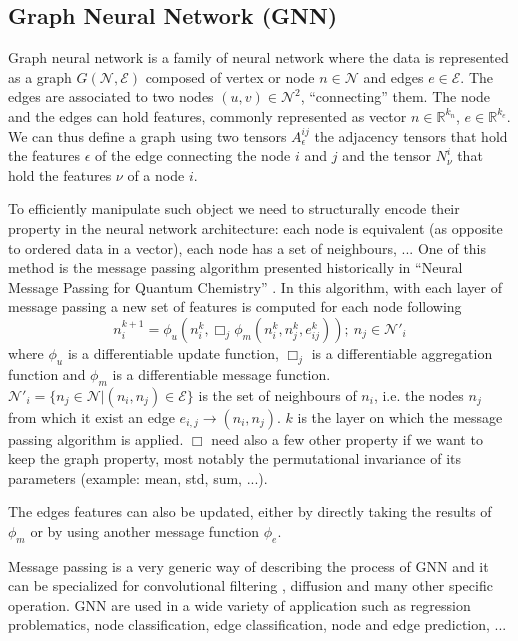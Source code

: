 \subsection{Graph Neural Network (GNN)}

Graph neural network is a family of neural network where the data is represented as a graph $G(\mathcal{N},\mathcal{E})$ composed of vertex or node $n \in \mathcal{N}$ and edges $e \in \mathcal{E}$. The edges are associated to two nodes $(u, v) \in \mathcal{N}^2$, ``connecting'' them. The node and the edges can hold features, commonly represented as vector $n \in \mathbb{R}^{k_{n}}$, $e \in \mathbb{R}^{k_{e}}$. We can thus define a graph using two tensors $A^{ij}_{\epsilon}$ the adjacency tensors that hold the features $\epsilon$ of the edge connecting the node $i$ and $j$ and the tensor $N^{i}_{\nu}$ that hold the features $\nu$ of a node $i$.

To efficiently manipulate such object we need to structurally encode their property in the neural network architecture: each node is equivalent (as opposite to ordered data in a vector), each node has a set of neighbours, ... One of this method is the message passing algorithm presented historically in ``Neural Message Passing for Quantum Chemistry'' \cite{gilmer_neural_2017}. In this algorithm, with each layer of message passing a new set of features is computed for each node following
\begin{equation}
  n_i^{k+1} = \phi_u (n_i^k, \Box_j \phi_m(n_i^k, n_j^k, e^k_{ij})); ~ n_j \in \mathcal{N}'_i
\end{equation}
where $\phi_u$ is a differentiable update function, $\Box_j$ is a differentiable aggregation function and $\phi_m$ is a differentiable message function. $\mathcal{N}'_i = \{n_j \in \mathcal{N} | (n_i, n_j) \in \mathcal{E}\}$ is the set of neighbours of $n_i$, i.e. the nodes $n_j$ from which it exist an edge $e_{i,j} \rightarrow (n_i, n_j)$. $k$ is the layer on which the message passing algorithm is applied. $\Box$ need also a few other property if we want to keep the graph property, most notably the permutational invariance of its parameters (example: mean, std, sum, ...).

The edges features can also be updated, either by directly taking the results of $\phi_m$ or by using another message function $\phi_e$.


Message passing is a very generic way of describing the process of GNN and it can be specialized for convolutional filtering \cite{defferrard_convolutional_2017}, diffusion \cite{li_diffusion_2018} and many other specific operation. GNN are used in a wide variety of application such as regression problematics, node classification, edge classification, node and edge prediction, ...


